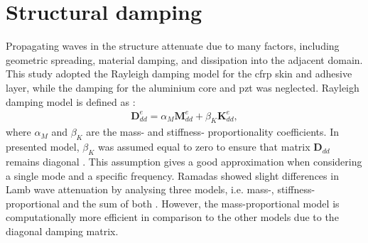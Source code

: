 \section{Structural damping}
\label{sec:damping}

Propagating waves in the structure attenuate due to many factors, including geometric spreading, material damping, and dissipation into the adjacent domain.
This study adopted the Rayleigh damping model for the \ac{cfrp} skin and adhesive layer, while the damping for the aluminium core and \ac{pzt} was neglected.
Rayleigh damping model is defined as \cite{wandowski2017guided}:
\begin{eqnarray}
	\textbf{D}_{dd}^e = \alpha_M \textbf{M}_{dd}^e + \beta_K \textbf{K}_{dd}^e,
	\label{eq:damping}
\end{eqnarray}
%
%
where \(\alpha_M\) and \(\beta_K\) are the mass- and stiffness- proportionality coefficients.
In presented model, \(\beta_K\) was assumed equal to zero to ensure that matrix \(\textbf{D}_{dd}\) remains diagonal \cite{schulte2011simulation, wandowski2017guided}.
This assumption gives a good approximation when considering a single mode and a specific frequency. 
Ramadas showed slight differences in Lamb wave attenuation by analysing three models, i.e. mass-, stiffness-proportional and the sum of both \cite{ramadas2011modelling}.
However, the mass-proportional model is computationally more efficient in comparison to the other models due to the diagonal damping matrix.